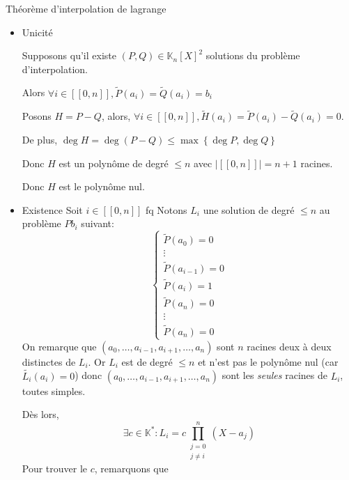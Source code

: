 \documentclass{article}
\begin{document}
\begin{question_kholle}
	[Il existe une unique solution $P$ de degré $\leqslant n$ au problème d'interpolation de lagrange, et elle s'exprime de la manière suivante en posant $$L_{i} = \prod_{\substack{j=0\\j \neq i}}^{n} \frac{X - a_{j}}{a_{i} - a_{j}}$$
	$$P = \sum_{i=0}^{n}b_{i}L_{i}$$]
	{Théorème d'interpolation de lagrange}
	
	\begin{itemize}
		\item Unicité
		
		Supposons qu'il existe $(P, Q) \in \mathbb{K}_n[X]^{2}$ solutions du problème d'interpolation.
		
		Alors $\forall i \in [ \! [ 0, n ] \!], \tilde{P}(a_{i}) = \tilde{Q}(a_{i}) = b_{i}$ 
		
		Posons $H = P - Q$, alors, $\forall i \in [ \! [ 0, n ] \!], \tilde{H}(a_{i}) = \tilde{P}(a_{i}) - \tilde{Q}(a_{i}) = 0$.
		
		De plus, $\deg H = \deg(P-Q) \leqslant \max \left\{ \deg P, \deg Q \right\}$
		
		Donc $H$ est un polynôme de degré $\leqslant n$ avec $\lvert [ \! [ 0, n ] \!] \rvert = n+1$ racines.
		
		Donc $H$ est le polynôme nul.
		\item Existence
		Soit $i \in [ \! [ 0, n ] \!]$ fq
		Notons $L_{i}$ une solution de degré $\leqslant n$ au problème $Pb_{i}$ suivant:
		$$
		\left\{ \begin{array}{ll}
			\tilde{P}(a_{0}) = 0 \\
			\vdots \\
			\tilde{P}(a_{i-1}) = 0 \\
			\tilde{P}(a_{i}) = 1 \\
			\tilde{P}(a_{n}) = 0 \\
			\vdots \\
			\tilde{P}(a_{n}) = 0
		\end{array} \right.
		$$
		On remarque que $(a_{0},\dots ,a_{i-1}, a_{i+1},\dots, a_{n})$ sont $n$ racines deux à deux distinctes de $L_{i}$. Or $L_{i}$ est de degré $\leqslant n$ et n'est pas le polynôme nul (car $\tilde{L_{i}}(a_{i}) = 0$) donc $(a_{0},\dots ,a_{i-1}, a_{i+1},\dots, a_{n})$ sont les \emph{seules} racines de $L_{i}$, toutes simples.
		
		Dès lors, 
		$$
		\exists c \in \mathbb{K}^{*} : L_{i} = c\prod_{\substack{j=0 \\ j\neq i}} ^{n}(X-a_{j})
		$$
		Pour trouver le $c$, remarquons que
		

\end{itemize}
\end{question_kholle}
\end{document}
